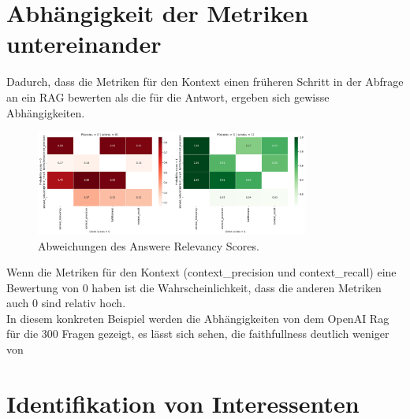 \section{Abhängigkeit der Metriken untereinander}
Dadurch, dass die Metriken für den Kontext einen früheren Schritt in der Abfrage an ein RAG bewerten als die für die Antwort, ergeben sich gewisse Abhängigkeiten.\\


\begin{figure}[htbp]
    \centering
    \includegraphics[width=0.8\textwidth]{images/metric_influence_400_300_O_O.png}
    \caption{Abweichungen des Answere Relevancy Scores.}
    \label{fig:sample-image}
\end{figure}

Wenn die Metriken für den Kontext (context\_precision und context\_recall) eine Bewertung von 0 haben ist die Wahrscheinlichkeit, dass die anderen Metriken auch 0 sind relativ hoch.\\
In diesem konkreten Beispiel werden die Abhängigkeiten von dem OpenAI Rag für die 300 Fragen gezeigt, es lässt sich sehen, die faithfullness deutlich weniger von 




\section{Identifikation von Interessenten}

